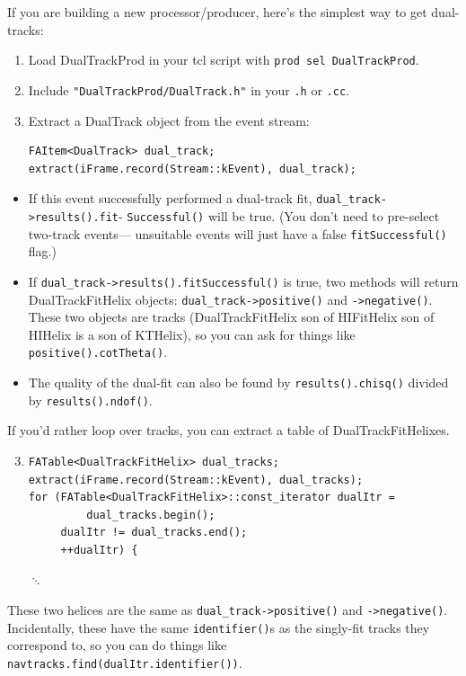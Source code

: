 \documentclass[12pt]{article}
\begin{document}
If you are building a new processor/producer, here's the simplest way
to get dual-tracks:
\begin{enumerate}

  \item Load DualTrackProd in your tcl script with {\tt prod sel
  DualTrackProd}.

  \item Include {\tt "DualTrackProd/DualTrack.h"} in your {\tt .h} or
  {\tt .cc}.

  \item Extract a DualTrack object from the event stream:
\begin{verbatim}FAItem<DualTrack> dual_track;
extract(iFrame.record(Stream::kEvent), dual_track); \end{verbatim}

\end{enumerate} \begin{itemize}

  \item If this event successfully performed a dual-track fit,
  {\tt dual\_track->results().fit}- {\tt Successful()} will be true.  (You
  don't need to pre-select two-track events--- unsuitable events will
  just have a false {\tt fitSuccessful()} flag.)

  \item If {\tt dual\_track->results().fitSuccessful()} is true, two
  methods will return DualTrackFitHelix objects:
  {\tt dual\_track->positive()} and {\tt ->negative()}.
  These two objects are tracks (DualTrackFitHelix son of HIFitHelix
  son of HIHelix is a son of KTHelix), so you can ask for things like
  {\tt positive().cotTheta()}.

  \item The quality of the dual-fit can also be found by
  {\tt results().chisq()} divided by {\tt results().ndof()}.

\end{itemize}

If you'd rather loop over tracks, you can extract a table of
DualTrackFitHelixes.
\begin{enumerate}\setcounter{enumi}{2}

  \item \begin{verbatim}FATable<DualTrackFitHelix> dual_tracks;
extract(iFrame.record(Stream::kEvent), dual_tracks);
for (FATable<DualTrackFitHelix>::const_iterator dualItr =
         dual_tracks.begin();
     dualItr != dual_tracks.end();
     ++dualItr) {\end{verbatim} \hspace{2 cm} $\ddots$

\end{enumerate}
These two helices are the same as {\tt dual\_track->positive()} and
{\tt ->negative()}.  Incidentally, these have the same
{\tt identifier()}s as the singly-fit tracks they correspond to, so
you can do things like {\tt navtracks.find(dualItr.identifier())}.
\end{document}
